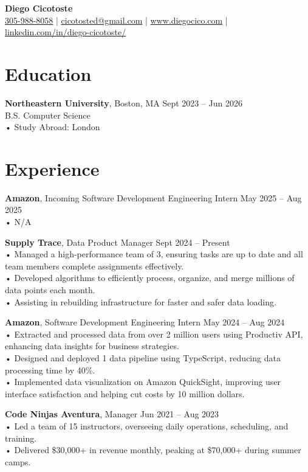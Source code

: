 \documentclass[a4paper,10pt]{article}
\begin{document}
\begin{center}
    {\LARGE \textbf{Diego Cicotoste}}\\
    \href{tel:305-988-8058}{305-988-8058} | \href{mailto:cicotosted@gmail.com}{cicotosted@gmail.com} | \href{https://www.diegocico.com}{www.diegocico.com} | \href{https://www.linkedin.com/in/diego-cicotoste/}{linkedin.com/in/diego-cicotoste/}
\end{center}

\section*{Education}
\textbf{Northeastern University}, Boston, MA \hfill Sept 2023 – Jun 2026 \\
B.S. Computer Science \\
• Study Abroad: London

\section*{Experience}
\textbf{Amazon}, Incoming Software Development Engineering Intern \hfill May 2025 – Aug 2025 \\
• N/A

\textbf{Supply Trace}, Data Product Manager \hfill Sept 2024 – Present \\
• Managed a high-performance team of 3, ensuring tasks are up to date and all team members complete assignments effectively.\\
• Developed algorithms to efficiently process, organize, and merge millions of data points each month.\\
• Assisting in rebuilding infrastructure for faster and safer data loading.

\textbf{Amazon}, Software Development Engineering Intern \hfill May 2024 – Aug 2024 \\
• Extracted and processed data from over 2 million users using Productiv API, enhancing data insights for business strategies.\\
• Designed and deployed 1 data pipeline using TypeScript, reducing data processing time by 40\%.\\
• Implemented data visualization on Amazon QuickSight, improving user interface satisfaction and helping cut costs by 10 million dollars.

\textbf{Code Ninjas Aventura}, Manager \hfill Jun 2021 – Aug 2023 \\
• Led a team of 15 instructors, overseeing daily operations, scheduling, and training.\\
• Delivered \$30,000+ in revenue monthly, peaking at \$70,000+ during summer camps.
\end{document}
